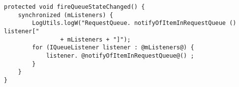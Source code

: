 \begin{lstlisting}[basicstyle=\small,caption={Example of code snippet \cite{030}},label={example001}]
protected void fireQueueStateChanged() {
	synchronized (mListeners) {
		LogUtils.logW("RequestQueue. notifyOfItemInRequestQueue () listener["
				+ mListeners + "]");
		for (IQueueListener listener : @mListeners@) {
			listener. @notifyOfItemInRequestQueue@() ;
		}
	}
}
\end{lstlisting}